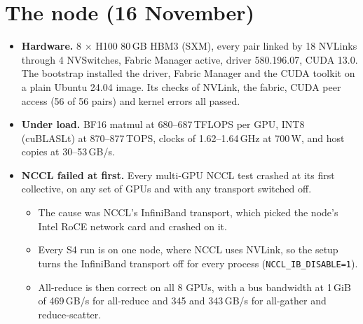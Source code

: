 \documentclass[11pt]{article}
\begin{document}
\section{The node (16 November)}\label{sec:node}
\begin{itemize}
\item \textbf{Hardware.} 8 $\times$ H100 80\,GB HBM3 (SXM), every pair linked by 18 NVLinks through 4 NVSwitches, Fabric Manager active, driver 580.196.07, CUDA 13.0. The bootstrap installed the driver, Fabric Manager and the CUDA toolkit on a plain Ubuntu 24.04 image. Its checks of NVLink, the fabric, CUDA peer access (56 of 56 pairs) and kernel errors all passed.
\item \textbf{Under load.} BF16 matmul at 680--687\,TFLOPS per GPU, INT8 (cuBLASLt) at 870--877\,TOPS, clocks of 1.62--1.64\,GHz at 700\,W, and host copies at 30--53\,GB/s.
\item \textbf{NCCL failed at first.} Every multi-GPU NCCL test crashed at its first collective, on any set of GPUs and with any transport switched off.
  \begin{itemize}
  \item The cause was NCCL's InfiniBand transport, which picked the node's Intel RoCE network card and crashed on it.
  \item Every S4 run is on one node, where NCCL uses NVLink, so the setup turns the InfiniBand transport off for every process (\texttt{NCCL\_IB\_DISABLE=1}).
  \item All-reduce is then correct on all 8 GPUs, with a bus bandwidth at 1\,GiB of 469\,GB/s for all-reduce and 345 and 343\,GB/s for all-gather and reduce-scatter.
  \end{itemize}
\end{itemize}

\end{document}
